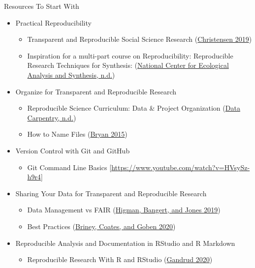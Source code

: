 \documentclass[
  ignorenonframetext,
]{beamer}
\providecommand{\tightlist}{%
  \setlength{\itemsep}{0pt}\setlength{\parskip}{0pt}}
\begin{document}
\begin{frame}{Resources To Start With}
\protect\hypertarget{resources-to-start-with}{}
\begin{itemize}
\tightlist
\item
  Practical Reproducibility

  \begin{itemize}
  \tightlist
  \item
    Transparent and Reproducible Social Science Research
    (\protect\hyperlink{ref-christensen2019}{Christensen 2019})
  \item
    Inspiration for a multi-part course on Reproducibility: Reproducible
    Research Techniques for Synthesis:
    (\protect\hyperlink{ref-nationalcenterforecologicalanalysisandsynthesis}{National
    Center for Ecological Analysis and Synthesis, n.d.})
  \end{itemize}
\item
  Organize for Transparent and Reproducible Research

  \begin{itemize}
  \tightlist
  \item
    Reproducible Science Curriculum: Data \& Project Organization
    (\protect\hyperlink{ref-datacarpentry}{Data Carpentry, n.d.})
  \item
    How to Name Files (\protect\hyperlink{ref-bryan2015}{Bryan 2015})
  \end{itemize}
\item
  Version Control with Git and GitHub

  \begin{itemize}
  \tightlist
  \item
    Git Command Line Basics
    {[}\url{https://www.youtube.com/watch?v=HVsySz-h9r4}{]}
  \end{itemize}
\item
  Sharing Your Data for Transparent and Reproducible Research

  \begin{itemize}
  \tightlist
  \item
    Data Management vs FAIR (\protect\hyperlink{ref-higman2019}{Higman,
    Bangert, and Jones 2019})
  \item
    Best Practices
    (\protect\hyperlink{ref-briney_foundational_2020}{Briney, Coates,
    and Goben 2020})
  \end{itemize}
\item
  Reproducible Analysis and Documentation in RStudio and R Markdown

  \begin{itemize}
  \tightlist
  \item
    Reproducible Research With R and RStudio
    (\protect\hyperlink{ref-gandrud2020}{Gandrud 2020})
  \end{itemize}
\end{itemize}

\end{frame}
\end{document}
